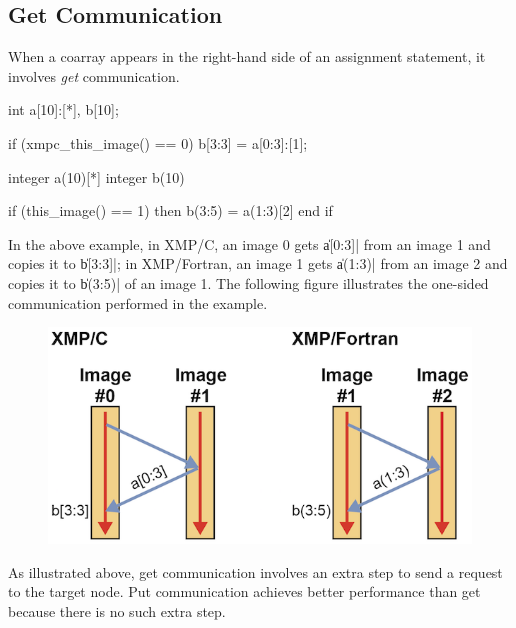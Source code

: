 

\subsection{Get Communication}

When a coarray appears in the right-hand side of an assignment
statement, it involves {\it get} communication.

\begin{XCexample}
int a[10]:[*], b[10];

if (xmpc_this_image() == 0)
  b[3:3] = a[0:3]:[1];
\end{XCexample}

\begin{XFexample}
integer a(10)[*]
integer b(10)

if (this_image() == 1) then
  b(3:5) = a(1:3)[2]
end if
\end{XFexample}

In the above example, in XMP/C, an image 0 gets \|a[0:3]| from an image
1 and copies it to \|b[3:3]|; in XMP/Fortran, an image 1 gets \|a(1:3)|
from an image 2 and copies it to \|b(3:5)| of an image 1. The following
figure illustrates the one-sided communication performed in the example.

\begin{figure}
  \centering
  \includegraphics{figs/get.png}
\end{figure}

\begin{myhint}
  As illustrated above, get communication involves an extra step to send a
  request to the target node. Put communication achieves better
  performance than get because there is no such extra step.
\end{myhint}


